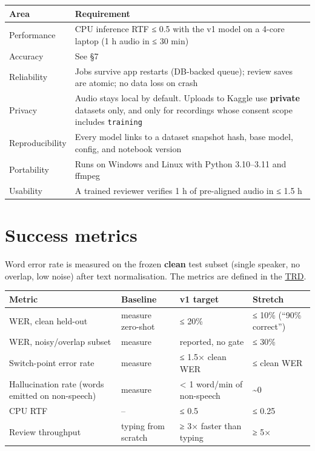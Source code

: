 \documentclass[11pt]{article}
\begin{document}
\begin{longtable}[]{@{}>{\raggedright\arraybackslash}p{}>{\raggedright\arraybackslash}p{}@{}}
\toprule\noalign{}
Area & Requirement \\
\midrule\noalign{}
\endhead
\bottomrule\noalign{}
\endlastfoot
Performance & CPU inference RTF ≤ 0.5 with the v1 model on a 4-core laptop (1 h audio in ≤ 30 min) \\
Accuracy & See §7 \\
Reliability & Jobs survive app restarts (DB-backed queue); review saves are atomic; no data loss on crash \\
Privacy & Audio stays local by default. Uploads to Kaggle use \textbf{private} datasets only, and only for recordings whose consent scope includes \texttt{training} \\
Reproducibility & Every model links to a dataset snapshot hash, base model, config, and notebook version \\
Portability & Runs on Windows and Linux with Python 3.10--3.11 and ffmpeg \\
Usability & A trained reviewer verifies 1 h of pre-aligned audio in ≤ 1.5 h \\
\end{longtable}

\hypertarget{success-metrics}{%
\section{Success metrics}\label{success-metrics}}

Word error rate is measured on the frozen \textbf{clean} test subset (single speaker, no overlap, low noise) after text normalisation. The metrics are defined in the \href{02_TRD.pdf}{TRD}.

\begin{longtable}[]{@{}>{\raggedright\arraybackslash}p{}>{\raggedright\arraybackslash}p{}>{\raggedright\arraybackslash}p{}>{\raggedright\arraybackslash}p{}@{}}
\toprule\noalign{}
Metric & Baseline & v1 target & Stretch \\
\midrule\noalign{}
\endhead
\bottomrule\noalign{}
\endlastfoot
WER, clean held-out & measure zero-shot & ≤ 20\% & ≤ 10\% (``90\% correct'') \\
WER, noisy/overlap subset & measure & reported, no gate & ≤ 30\% \\
Switch-point error rate & measure & ≤ 1.5× clean WER & ≤ clean WER \\
Hallucination rate (words emitted on non-speech) & measure & \textless{} 1 word/min of non-speech & \textasciitilde0 \\
CPU RTF & -- & ≤ 0.5 & ≤ 0.25 \\
Review throughput & typing from scratch & ≥ 3× faster than typing & ≥ 5× \\
\end{longtable}
\end{document}
